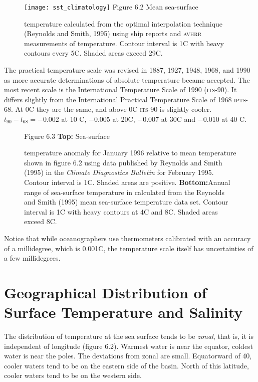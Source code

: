 \begin{figure}[t!]
\texttt{[image: sst\_climatology]}
\footnotesize
Figure 6.2 Mean sea-surface \rule{0mm}{3ex}temperature calculated from the optimal interpolation technique (Reynolds and Smith, 1995) using ship reports and \textsc{avhrr} measurements of temperature. Contour interval is 1\degrees C with heavy contours every 5\degrees C. Shaded areas exceed 29\degrees C.
\label{fig:sst_climatology}
\vspace{-4ex}
\end{figure}

The practical temperature scale was revised in 1887, 1927, 1948, 1968, and 1990
as more accurate determinations of absolute temperature became accepted. The most
recent scale is the International Temperature Scale of 1990 (\textsc{its}-90). It
differs slightly from the International Practical Temperature Scale of
1968 \textsc{ipts}-68. At 0\degrees C they are the same, and above 0\degrees C
\textsc{its}-90 is slightly cooler. $t_{90}-t_{68} = -0.002$ at 10\degrees
C, $-0.005$ at 20\degrees C, $-0.007$ at 30\degrees C and $-0.010$ at 40\degrees
C.

\begin{figure}[b!]
\vspace{-3ex}
\footnotesize
Figure 6.3 \textbf{Top:} Sea-surface \rule{0mm}{3ex}temperature anomaly for January 1996 relative to mean temperature shown in figure 6.2 using data published by Reynolds and Smith (1995) in the \textit{Climate Diagnostics Bulletin} for February 1995. Contour interval is 1\degrees C. Shaded areas are
positive. \textbf{Bottom:}Annual range of sea-surface temperature in  calculated from the Reynolds and Smith (1995) mean sea-surface temperature data set. Contour interval is 1\degrees C with heavy contours at 4\degrees C and 8\degrees C. Shaded areas exceed 8\degrees C.
\label{fig:SSTvariability}
\end{figure}

Notice that while oceanographers use thermometers calibrated with an
accuracy of a millidegree, which is 0.001\degrees C, the
temperature scale itself has uncertainties of a few millidegrees.

\section[Geographical Distribution]{Geographical Distribution of Surface
Temperature and Salinity} The distribution of temperature
at the sea surface tends to be \textit{zonal}, that is, it is
independent of longitude (figure 6.2). Warmest water is near the equator, coldest
water is near the poles. The deviations from zonal are small. Equatorward of
40\degrees, cooler waters tend to be on the eastern side of the basin. North of this
latitude, cooler waters tend to be on the western side.

